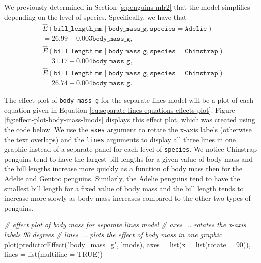 \documentclass[
]{book}
\newenvironment{Shaded}{\begin{snugshade}}{\end{snugshade}}
\newcommand{\AttributeTok}[1]{\textcolor[rgb]{0.77,0.63,0.00}{#1}}
\newcommand{\CommentTok}[1]{\textcolor[rgb]{0.56,0.35,0.01}{\textit{#1}}}
\newcommand{\ConstantTok}[1]{\textcolor[rgb]{0.00,0.00,0.00}{#1}}
\newcommand{\DecValTok}[1]{\textcolor[rgb]{0.00,0.00,0.81}{#1}}
\newcommand{\FunctionTok}[1]{\textcolor[rgb]{0.00,0.00,0.00}{#1}}
\newcommand{\NormalTok}[1]{#1}
\newcommand{\StringTok}[1]{\textcolor[rgb]{0.31,0.60,0.02}{#1}}
\theoremstyle{definition}
\theoremstyle{definition}
\theoremstyle{definition}
\theoremstyle{definition}
\theoremstyle{remark}
\begin{document}
We previously determined in Section \ref{s:penguins-mlr2} that the
model simplifies depending on the level of species. Specifically, we
have that \[
\begin{aligned}
&\hat{E}(\mathtt{bill\_length\_mm} \mid \mathtt{body\_mass\_g}, \mathtt{species}=\mathtt{Adelie}) \\
&= 26.99 + 0.003 \mathtt{body\_mass\_g},\\
&\hat{E}(\mathtt{bill\_length\_mm} \mid \mathtt{body\_mass\_g}, \mathtt{species}=\mathtt{Chinstrap}) \\
&= 31.17 + 0.004 \mathtt{body\_mass\_g},\\
&\hat{E}(\mathtt{bill\_length\_mm} \mid \mathtt{body\_mass\_g}, \mathtt{species}=\mathtt{Chinstrap}) \\
&= 26.74 + 0.004 \mathtt{body\_mass\_g}.
\end{aligned}
\label{eq:separate-lines-equations-effects-plot}
\]

The effect plot of \texttt{body\_mass\_g} for the separate lines model will be a
plot of each equation given in Equation
\eqref{eq:separate-lines-equations-effects-plot}. Figure
\ref{fig:effect-plot-body-mass-lmods} displays this effect plot, which
was created using the code below. We use the \texttt{axes} argument to rotate
the x-axis labels (otherwise the text overlaps) and the \texttt{lines}
arguments to display all three lines in one graphic instead of a
separate panel for each level of \texttt{species}. We notice Chinstrap penguins
tend to have the largest bill lengths for a given value of body mass and
the bill lengths increase more quickly as a function of body mass then
for the Adelie and Gentoo penguins. Similarly, the Adelie penguins tend
to have the smallest bill length for a fixed value of body mass and the
bill length tends to increase more slowly as body mass increases
compared to the other two types of penguins.

\begin{Shaded}
\begin{Highlighting}[]
\CommentTok{\# effect plot of body mass for separate lines model}
\CommentTok{\# axes ... rotates the x{-}axis labels 90 degrees}
\CommentTok{\# lines ... plots the effect of body mass in one graphic}
\FunctionTok{plot}\NormalTok{(}\FunctionTok{predictorEffect}\NormalTok{(}\StringTok{"body\_mass\_g"}\NormalTok{, lmods),}
     \AttributeTok{axes =} \FunctionTok{list}\NormalTok{(}\AttributeTok{x =} \FunctionTok{list}\NormalTok{(}\AttributeTok{rotate =} \DecValTok{90}\NormalTok{)),}
     \AttributeTok{lines =} \FunctionTok{list}\NormalTok{(}\AttributeTok{multiline =} \ConstantTok{TRUE}\NormalTok{))}
\end{Highlighting}
\end{Shaded}
\end{document}
